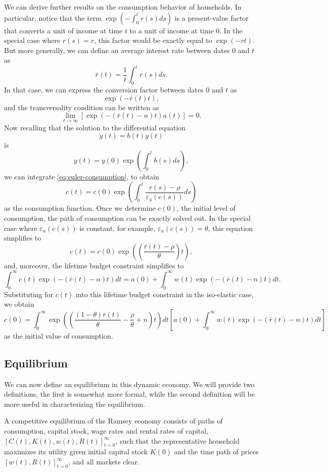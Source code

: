 \documentclass[\topdir/lecture\_notes.tex]{subfiles}
\begin{document}
We can derive further results on the consumption behavior of households. In particular, notice that the term $\exp \left(-\int_{0}^{t} r(s) ds\right)$ is a present-value factor that converts a unit of income at time $t$ to a unit of income at time 0. In the special case where $r(s)=r$, this factor would be exactly equal to $\exp(-rt)$. But more generally, we can define an average interest rate between dates 0 and $t$ as
\[
  \bar{r}(t)=\frac{1}{t} \int_{0}^{t} r(s) ds.
\]
In that case, we can express the conversion factor between dates 0 and $t$ as
\[
  \exp(-\bar{r}(t) t),
\]
and the transversality condition can be written as
\[
  \lim _{t \rightarrow \infty}[\exp(-(\bar{r}(t)-n) t) a(t)]=0.
\]
Now recalling that the solution to the differential equation
\[
  \dot{y}(t)=b(t) y(t)
\]
is
\[
  y(t)=y(0) \exp \left(\int_{0}^{t} b(s) ds\right),
\]
we can integrate \eqref{eq:euler-consumption}, to obtain
\[
  c(t)=c(0) \exp \left(\int_{0}^{t} \frac{r(s)-\rho}{\varepsilon_{u}(c(s))} ds\right)
\]
as the consumption function. Once we determine $c(0)$, the initial level of consumption, the path of consumption can be exactly solved out. In the special case where $\varepsilon_{u}(c(s))$ is constant,
for example, $\varepsilon_{u}(c(s))=\theta$, this equation simplifies to
\[
  c(t)=c(0) \exp \left(\left(\frac{\bar{r}(t)-\rho}{\theta}\right) t\right),
\]
and, moreover, the lifetime budget constraint simplifies to
\[
  \int_{0}^{\infty} c(t) \exp(-(\bar{r}(t)-n) t) dt=a(0)+\int_{0}^{\infty} w(t) \exp(-(\bar{r}(t)-n) t) dt.
\]
Substituting for $c(t)$ into this lifetime budget constraint in the iso-elastic case, we obtain
\[
  c(0)=\int_{0}^{\infty} \exp \left(\left(\frac{(1-\theta) \bar{r}(t)}{\theta}-\frac{\rho}{\theta}+n\right) t\right) dt\left[a(0)+\int_{0}^{\infty} w(t) \exp(-(\bar{r}(t)-n) t) dt\right]
\]
as the initial value of consumption.

\subsection{Equilibrium}
We can now define an equilibrium in this dynamic economy.
We will provide two definitions, the first is somewhat more formal, while the second definition will be more useful in characterizing the equilibrium.

\begin{defn}\label{def:competitive-equilibrium-1}
  A competitive equilibrium of the Ramsey economy consists of paths of consumption, capital stock, wage rates and rental rates of capital, $[C(t), K(t), w(t), R(t)]_{t=0}^{\infty}$, such that the representative household maximizes its utility given initial capital stock $K(0)$ and the time path of prices $[w(t), R(t)]_{t=0}^{\infty}$, and all markets clear.
\end{defn}
\end{document}
